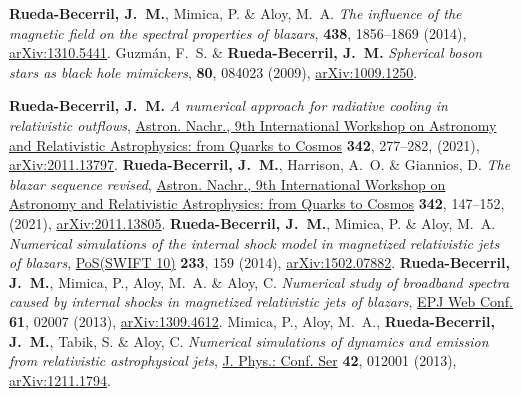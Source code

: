 \begin{thebibliography}{99}
   \textbf{Rueda-Becerril, J.~M.}, Mimica, P. \& Aloy, M.~A. \textit{The influence of the magnetic field on the spectral properties of blazars}, \href{https://doi.org/10.1093/mnras/stt2335}{\mnras} \textbf{438}, 1856--1869 (2014), \href{https://arxiv.org/abs/1310.5441}{arXiv:1310.5441}.
   Guzmán, F.~S. \& \textbf{Rueda-Becerril, J.~M.} \textit{Spherical boson stars as black hole mimickers},  \href{https://doi.org/10.1103/PhysRevD.80.084023}{\prd} \textbf{80}, 084023 (2009), \href{https://arxiv.org/abs/1009.1250}{arXiv:1009.1250}.
\end{thebibliography}

\renewcommand{\refname}{Proceedings}
\setcounter{num}{0}
\renewcommand{\MyNbOfPub}{5}%
\renewcommand*{\bibliographyitemlabel}{\arabic{enumiv}.}
\begin{thebibliography}{99}
   \textbf{Rueda-Becerril, J.~M.} \emph{A numerical approach for radiative cooling in relativistic outflows}, \href{https://doi.org/10.1002/asna.202113919}{Astron. Nachr., 9th International Workshop on Astronomy and Relativistic Astrophysics: from Quarks to Cosmos} \textbf{342}, 277--282, (2021), \href{https://arxiv.org/abs/2011.13797}{arXiv:2011.13797}.
   \textbf{Rueda-Becerril, J.~M.}, Harrison, A.~O. \& Giannios, D. \emph{The blazar sequence revised}, \href{https://doi.org/10.1002/asna.202113919}{Astron. Nachr., 9th International Workshop on Astronomy and Relativistic Astrophysics: from Quarks to Cosmos} \textbf{342}, 147--152, (2021), \href{https://arxiv.org/abs/2011.13805}{arXiv:2011.13805}.
   \textbf{Rueda-Becerril, J.~M.}, Mimica, P. \& Aloy, M.~A. \emph{Numerical simulations of the internal shock model in magnetized relativistic jets of blazars}, \href{https://doi.org/10.22323/1.233.0159}{PoS(SWIFT 10)} \textbf{233}, 159 (2014), \href{https://arxiv.org/abs/1502.07882}{arXiv:1502.07882}.
   \textbf{Rueda-Becerril, J.~M.}, Mimica, P., Aloy, M.~A. \& Aloy, C. \emph{Numerical study of broadband spectra caused by internal shocks in magnetized relativistic jets of blazars}, \href{https://doi.org/10.1051/epjconf/20136102007}{EPJ Web Conf.} \textbf{61}, 02007 (2013), \href{https://arxiv.org/abs/1309.4612}{arXiv:1309.4612}.
   Mimica, P., Aloy, M.~A., \textbf{Rueda-Becerril, J.~M.}, Tabik, S. \& Aloy, C. \emph{Numerical simulations of dynamics and emission from relativistic astrophysical jets}, \href{https://doi.org/10.1088/1742-6596/454/1/012001}{J. Phys.: Conf. Ser} \textbf{42}, 012001 (2013), \href{https://arxiv.org/abs/1211.1794}{arXiv:1211.1794}.
\end{thebibliography}


